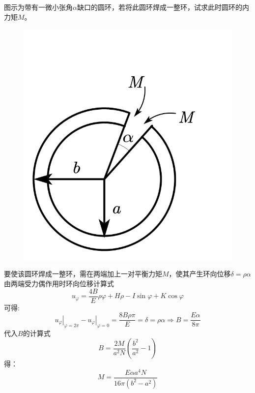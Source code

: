 \begin{example}
图示为带有一微小张角$\alpha$缺口的圆环，若将此圆环焊成一整环，试求此时圆环的内力矩$M$。
\begin{figure}[!h]
\centering
\includegraphics[scale=0.6]{figure/4-11.png}
\end{figure}
\end{example}
\begin{remark}
要使该圆环焊成一整环，需在两端加上一对平衡力矩$M$，使其产生环向位移$\delta =\rho \alpha $由两端受力偶作用时环向位移计算式\[u_{\varphi}=\frac{4B}{E}\rho \varphi +H\rho -I\sin \varphi +K\cos \varphi \]
可得:\[\left. u_{\varphi} \right|_{\varphi =2\pi}-\left. u_{\varphi} \right|_{\varphi =0}=\frac{8B\rho \pi}{E}=\delta =\rho \alpha \Rightarrow B=\frac{E\alpha}{8\pi}\]
代入$B$的计算式\[B=\frac{2M}{a^2N}\left( \frac{b^2}{a^2}-1 \right) \]
得：\[M=\frac{E\alpha a^4N}{16\pi \left( b^2-a^2 \right)}\]
\end{remark}

